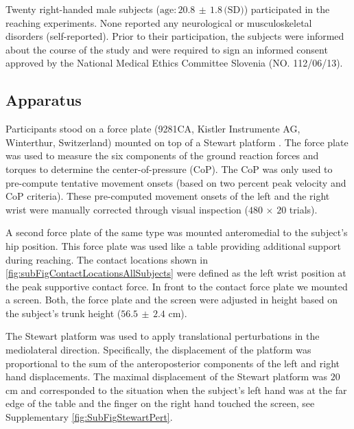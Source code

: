 Twenty right-handed male subjects ($\textrm{age:} \, 20.8 \, \pm  \, 1.8 \,
\textrm{(SD)}$) participated in the reaching experiments. None reported any neurological or musculoskeletal
disorders (self-reported). Prior to their participation, the subjects were
informed about the course of the study and were required to sign an informed
consent approved by the National Medical Ethics Committee Slovenia (NO. 112/06/13).

\subsection*{Apparatus}

Participants stood on a force plate (9281CA, Kistler Instrumente AG, Winterthur,
Switzerland) mounted on top of a Stewart platform \cite{stewart1965platform}.
The force plate was used to measure the six components of the ground reaction
forces and torques to determine the center-of-pressure (CoP). The CoP was only used 
to pre-compute tentative movement onsets (based on two percent peak velocity and CoP criteria).
These pre-computed movement onsets of the left and the right wrist were manually corrected through visual inspection ($480\,\times\,20$ trials). 

A second force plate of the same type was mounted anteromedial to the subject's hip
position. This force plate was used like a table providing additional support 
during reaching. The contact locations shown in \FigureAbbr \ref{fig:subFigContactLocationsAllSubjects} were
defined as the left wrist position at the peak supportive contact force. In front to the 
contact force plate we mounted a screen. Both, the force plate and the screen
were adjusted in height based on the subject's trunk height ($56.5 \, \pm \, 2.4$ cm).

The Stewart platform was used to apply translational perturbations in the 
mediolateral direction. Specifically, the displacement of the platform was 
proportional to the sum of the anteroposterior components of the left and right 
hand displacements. The maximal displacement of the Stewart platform was $20$ cm 
and corresponded to the situation when the subject's left hand was at the far 
edge of the table and the finger on the right hand touched the screen, see 
Supplementary \FigureAbbr \ref{fig:SubFigStewartPert}.

